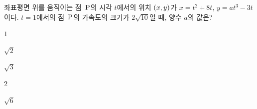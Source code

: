 좌표평면 위를 움직이는 점~$\mathrm{P}$의 시각 $t$에서의 위치 $(x{,}\mkern3mu\mathopen{}y)$가 $x=t^2+8t$, $y=at^3-3t$이다. $t=1$에서의 점~$\mathrm{P}$의 가속도의 크기가 $2\sqrt{10}$일 때, 양수 $a$의 값은?
\begin{choices32}{\rule[-3ex]{0pt}{8ex}$1$}{\rule[-3ex]{0pt}{8ex}$\sqrt{2}$}{\rule[-3ex]{0pt}{8ex}$\sqrt{3}$}{\rule[-3ex]{0pt}{8ex}$2$}{\rule[-3ex]{0pt}{8ex}$\sqrt{6}$}\end{choices32}
